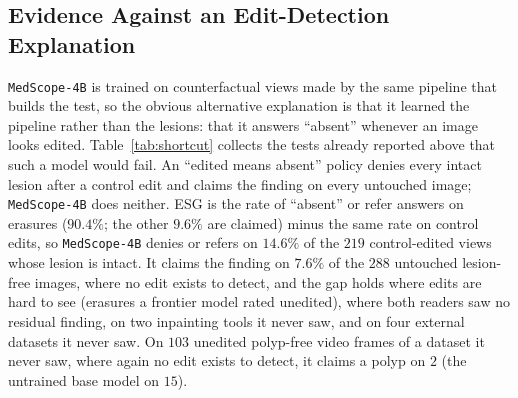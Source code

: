 \documentclass[5p,times,twocolumn,authoryear]{elsarticle}
\begin{document}
\subsection{Evidence Against an Edit-Detection Explanation}
\label{subsec:disc_shortcut}
\texttt{MedScope-4B} is trained on counterfactual views made by the same pipeline that builds the test, so the obvious alternative explanation is that it learned the pipeline rather than the lesions: that it answers ``absent'' whenever an image looks edited. Table~\ref{tab:shortcut} collects the tests already reported above that such a model would fail. An ``edited means absent'' policy denies every intact lesion after a control edit and claims the finding on every untouched image; \texttt{MedScope-4B} does neither. ESG is the rate of ``absent'' or refer answers on erasures ($90.4\%$; the other $9.6\%$ are claimed) minus the same rate on control edits, so \texttt{MedScope-4B} denies or refers on $14.6\%$ of the $219$ control-edited views whose lesion is intact. It claims the finding on $7.6\%$ of the $288$ untouched lesion-free images, where no edit exists to detect, and the gap holds where edits are hard to see (erasures a frontier model rated unedited), where both readers saw no residual finding, on two inpainting tools it never saw, and on four external datasets it never saw. On $103$ unedited polyp-free video frames of a dataset it never saw, where again no edit exists to detect, it claims a polyp on $2$ (the untrained base model on $15$).
\end{document}
